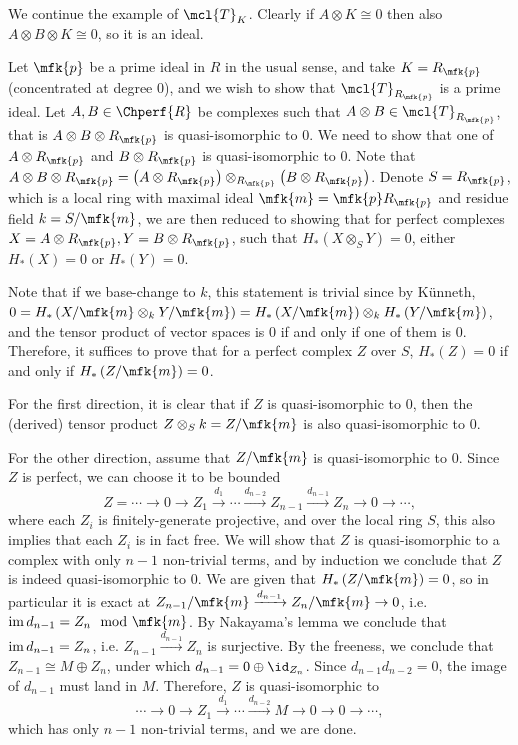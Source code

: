 \begin{example}
	We continue the example of $\mcl{T}_K$.
	Clearly if $A \otimes K \cong 0$ then also $A \otimes B \otimes K \cong 0$, so it is an ideal.
	
	Let $\mfk{p}$ be a prime ideal in $R$ in the usual sense, and take $K = R_\mfk{p}$ (concentrated at degree $0$), and we wish to show that $\mcl{T}_{R_\mfk{p}}$ is a prime ideal.
	Let $A,B \in \Chperf{R}$ be complexes such that $A \otimes B \in \mcl{T}_{R_\mfk{p}}$, that is $A \otimes B \otimes R_\mfk{p}$ is quasi-isomorphic to $0$.
	We need to show that one of $A \otimes R_\mfk{p}$ and $B \otimes R_\mfk{p}$ is quasi-isomorphic to $0$.
	Note that $A \otimes B \otimes R_\mfk{p} = \left(A \otimes R_\mfk{p}\right) \otimes_{R_\mfk{p}} \left(B \otimes R_\mfk{p}\right)$.
	Denote $S = R_\mfk{p}$, which is a local ring with maximal ideal $\mfk{m} = \mfk{p} R_\mfk{p}$ and residue field $k = S/\mfk{m}$, we are then reduced to showing that for perfect complexes $X = A \otimes R_\mfk{p}, Y = B \otimes R_\mfk{p}$, such that $H_*\left(X \otimes_S Y\right) = 0$, either $H_*\left(X\right) = 0$ or $H_*\left(Y\right) = 0$.
	
	Note that if we base-change to $k$, this statement is trivial since by K\"unneth, $0 = H_*\left(X/\mfk{m} \otimes_k Y/\mfk{m}\right) = H_*\left(X/\mfk{m}\right) \otimes_k H_*\left(Y/\mfk{m}\right)$, and the tensor product of vector spaces is $0$ if and only if one of them is $0$.
	Therefore, it suffices to prove that for a perfect complex $Z$ over $S$, $H_*\left(Z\right) = 0$ if and only if $H_*\left(Z/\mfk{m}\right) = 0$.
	
	For the first direction, it is clear that if $Z$ is quasi-isomorphic to $0$, then the (derived) tensor product $Z \otimes_S k = Z/\mfk{m}$ is also quasi-isomorphic to $0$.
	
	For the other direction, assume that $Z/\mfk{m}$ is quasi-isomorphic to $0$.
	Since $Z$ is perfect, we can choose it to be bounded
	$$
	Z = \cdots \to 0 \to Z_1 \xrightarrow{d_1} \cdots \xrightarrow{d_{n-2}} Z_{n-1} \xrightarrow{d_{n-1}} Z_n \to 0 \to \cdots,
	$$
	where each $Z_i$ is finitely-generate projective, and over the local ring $S$, this also implies that each $Z_i$ is in fact free.
	We will show that $Z$ is quasi-isomorphic to a complex with only $n-1$ non-trivial terms, and by induction we conclude that $Z$ is indeed quasi-isomorphic to $0$.
	We are given that $H_*\left(Z/\mfk{m}\right) = 0$, so in particular it is exact at $Z_{n-1}/\mfk{m} \xrightarrow{d_{n-1}} Z_n/\mfk{m} \to 0$, i.e. $\im d_{n-1} = Z_n \mod \mfk{m}$.
	By Nakayama's lemma we conclude that $\operatorname{im} d_{n-1} = Z_n$, i.e. $Z_{n-1} \xrightarrow{d_{n-1}} Z_n$ is surjective.
	By the freeness, we conclude that $Z_{n-1} \cong M \oplus Z_n$, under which $d_{n-1} = 0 \oplus \id_{Z_n}$.
	Since $d_{n-1} d_{n-2} = 0$, the image of $d_{n-1}$ must land in $M$.
	Therefore, $Z$ is quasi-isomorphic to
	$$
	\cdots \to 0 \to Z_1 \xrightarrow{d_1} \cdots \xrightarrow{d_{n-2}} M \to 0 \to 0 \to \cdots,
	$$
	which has only $n-1$ non-trivial terms, and we are done.
\end{example}

